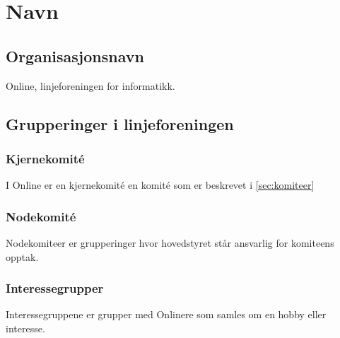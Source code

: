 \chapter{Navn}
\section{Organisasjonsnavn}
\vspace{23pt}
Online, linjeforeningen for informatikk.




\section{Grupperinger i linjeforeningen}
\vspace{23pt}

\subsection{Kjernekomité}

I Online er en kjernekomité en komité som er beskrevet i \ref{sec:komiteer}

\subsection{Nodekomité}

Nodekomiteer er grupperinger hvor hovedstyret står ansvarlig for komiteens opptak.


\subsection{Interessegrupper}

Interessegruppene er grupper med Onlinere som samles om en hobby eller interesse.

